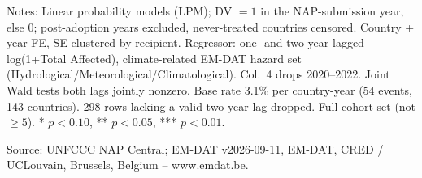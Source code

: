 \begin{table}[H]
\centering
\caption{NAP submission timing and lagged EM-DAT natural-hazard realizations}
\label{tab:nap_timing_emdat_hazard}
\par\vspace{4pt}
\begin{minipage}{\linewidth}\footnotesize
Notes: Linear probability models (LPM); DV $= 1$ in the NAP-submission year, else 0; post-adoption years excluded, never-treated countries censored. Country + year FE, SE clustered by recipient. Regressor: one- and two-year-lagged log(1+Total Affected), climate-related EM-DAT hazard set (Hydrological/Meteorological/Climatological). Col.\ 4 drops 2020--2022. Joint Wald tests both lags jointly nonzero. Base rate 3.1\% per country-year (54 events, 143 countries). 298 rows lacking a valid two-year lag dropped. Full cohort set (not $\geq 5$). * $p<0.10$, ** $p<0.05$, *** $p<0.01$.\par
Source: UNFCCC NAP Central; EM-DAT v2026-09-11, EM-DAT, CRED / UCLouvain, Brussels, Belgium -- www.emdat.be.
\end{minipage}
\end{table}
